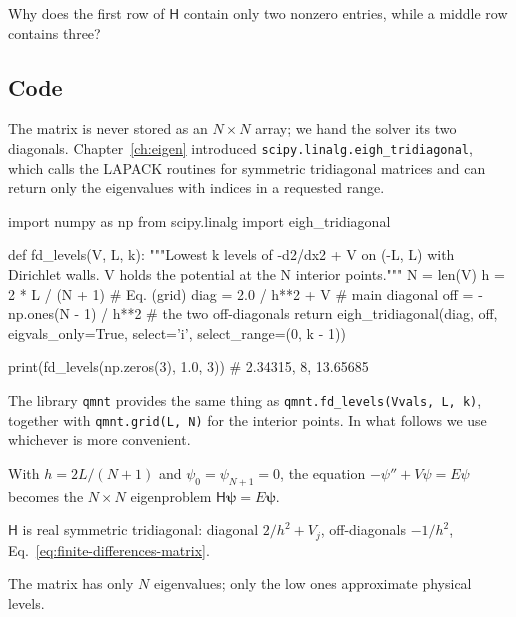 \begin{checkpoint}
Why does the first row of $\mathsf H$ contain only two nonzero entries, while a middle row contains three?
\end{checkpoint}

\subsection{Code}

The matrix is never stored as an $N\times N$ array; we hand the solver its two diagonals. Chapter~\ref{ch:eigen} introduced \texttt{scipy.linalg.eigh\_tridiagonal}, which calls the LAPACK routines for symmetric tridiagonal matrices and can return only the eigenvalues with indices in a requested range.

\begin{pycode}
import numpy as np
from scipy.linalg import eigh_tridiagonal

def fd_levels(V, L, k):
    """Lowest k levels of -d2/dx2 + V on (-L, L) with Dirichlet walls.
    V holds the potential at the N interior points."""
    N = len(V)
    h = 2 * L / (N + 1)                  # Eq. (grid)
    diag = 2.0 / h**2 + V                # main diagonal
    off = -np.ones(N - 1) / h**2         # the two off-diagonals
    return eigh_tridiagonal(diag, off, eigvals_only=True,
                            select='i', select_range=(0, k - 1))

print(fd_levels(np.zeros(3), 1.0, 3))    # 2.34315, 8, 13.65685
\end{pycode}

The library \texttt{qmnt} provides the same thing as \texttt{qmnt.fd\_levels(Vvals, L, k)}, together with \texttt{qmnt.grid(L, N)} for the interior points. In what follows we use whichever is more convenient.

\begin{keyideas}
\item With $h=2L/(N+1)$ and $\psi_0=\psi_{N+1}=0$, the equation $-\psi''+V\psi=E\psi$ becomes the $N\times N$ eigenproblem $\mathsf H\bm\psi=E\bm\psi$.
\item $\mathsf H$ is real symmetric tridiagonal: diagonal $2/h^2+V_j$, off-diagonals $-1/h^2$, Eq.~\eqref{eq:finite-differences-matrix}.
\item The matrix has only $N$ eigenvalues; only the low ones approximate physical levels.
\end{keyideas}

